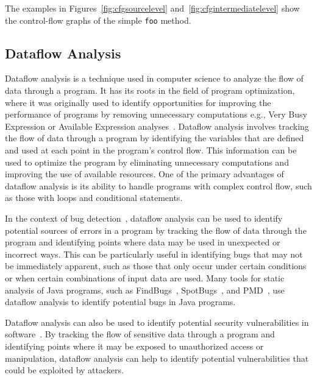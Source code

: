 The examples in Figures~\ref{fig:cfgsourcelevel} and~\ref{fig:cfgintermediatelevel} show the control-flow 
graphs of the simple \texttt{foo} method.


\subsection{Dataflow Analysis}
\label{sec:dataflowanalysis}
Dataflow analysis is a technique used in computer science to analyze the flow of 
data through a program. It has its roots in the field of program optimization, 
where it was originally used to identify opportunities for improving the performance 
of programs by removing unnecessary computations e.g., Very Busy Expression or Available Expression analyses~\cite{aho2007compilers,vallee-rai10soot,falconer2007deepweaver,sagiv1996ide,kildall1973dataflow}.
Dataflow analysis involves tracking the flow of data through a program by 
identifying the variables that are defined and used at each point in the program's 
control flow. This information can be used to optimize the program by eliminating 
unnecessary computations and improving the use of available resources.
One of the primary advantages of dataflow analysis is its ability to handle programs 
with complex control flow, such as those with loops and conditional statements. 

In the context of bug detection~\cite{spoon, fink2012wala}, dataflow analysis can be used to identify 
potential sources of errors in a program by tracking the flow of data through 
the program and identifying points where data may be used in unexpected or 
incorrect ways. This can be particularly useful in identifying bugs that may 
not be immediately apparent, such as those that only occur under certain 
conditions or when certain combinations of input data are used.
Many tools for static analysis of Java programs, such as FindBugs~\cite{findbugs},
SpotBugs~\cite{spotbugs}, and PMD~\cite{copeland2005pmd}, use dataflow analysis to identify
potential bugs in Java programs. 

Dataflow analysis can also be used to identify potential security vulnerabilities 
in software~\cite{flowDroid,piskachev2021secucheck,lawall10coccinelle}. By tracking the flow of sensitive data through a program and  
identifying points where it may be exposed to unauthorized access or manipulation, 
dataflow analysis can help to identify potential vulnerabilities that could be 
exploited by attackers. 

